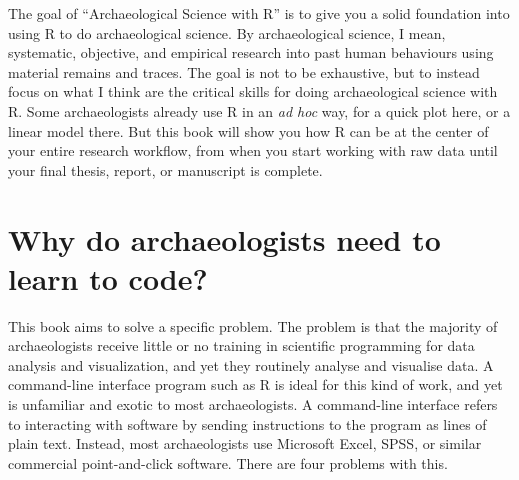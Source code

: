 \documentclass[]{book}
\begin{document}
The goal of ``Archaeological Science with R'' is to give you a solid
foundation into using R to do archaeological science. By archaeological
science, I mean, systematic, objective, and empirical research into past
human behaviours using material remains and traces. The goal is not to
be exhaustive, but to instead focus on what I think are the critical
skills for doing archaeological science with R. Some archaeologists
already use R in an \emph{ad hoc} way, for a quick plot here, or a
linear model there. But this book will show you how R can be at the
center of your entire research workflow, from when you start working
with raw data until your final thesis, report, or manuscript is
complete.

\section{Why do archaeologists need to learn to
code?}\label{why-do-archaeologists-need-to-learn-to-code}

This book aims to solve a specific problem. The problem is that the
majority of archaeologists receive little or no training in scientific
programming for data analysis and visualization, and yet they routinely
analyse and visualise data. A command-line interface program such as R
is ideal for this kind of work, and yet is unfamiliar and exotic to most
archaeologists. A command-line interface refers to interacting with
software by sending instructions to the program as lines of plain text.
Instead, most archaeologists use Microsoft Excel, SPSS, or similar
commercial point-and-click software. There are four problems with this.
\end{document}
